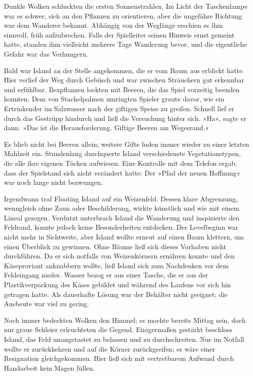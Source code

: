 Dunkle Wolken schluckten die ersten Sonnenstrahlen. Im Licht der Taschenlampe war es schwer, sich an den Pflanzen zu orientieren, aber die ungefähre Richtung war dem Wanderer bekannt. Abhängig von der Weglänge erschien es ihm sinnvoll, früh aufzubrechen. Falls der Spielleiter seinen Hinweis ernst gemeint hatte, standen ihm vielleicht mehrere Tage Wanderung bevor, und die eigentliche Gefahr war das Verhungern.

Bald war Island an der Stelle angekommen, die er vom Baum aus erblickt hatte. Hier verlief der Weg durch Gebüsch und war zwischen Sträuchern gut erkennbar und erfühlbar. Ilexpflanzen lockten mit Beeren, die das Spiel vorzeitig beenden konnten. Dem von Stachelpalmen umringten Spieler graute davor, wie ein Ertrinkender im Salzwasser nach der giftigen Speise zu greifen. Schnell lief er durch das Gestrüpp hindurch und ließ die Versuchung hinter sich. »Ha«, sagte er dann. »Das ist die Herausforderung. Giftige Beeren am Wegesrand.«

Es blieb nicht bei Beeren allein; weitere Gifte luden immer wieder zu einer letzten Mahlzeit ein. Stundenlang durchquerte Island verschiedenste Vegetationstypen, die alle ihre eigenen Tücken aufwiesen. Eine Kontrolle mit dem Telefon ergab, dass der Spielstand sich nicht verändert hatte: Der »Pfad der neuen Hoffnung« war noch lange nicht bezwungen.

Irgendwann traf Floating Island auf ein Weizenfeld. Dessen klare Abgrenzung, wenngleich ohne Zaun oder Beschilderung, wirkte künstlich und wie mit einem Lineal gezogen. Verdutzt unterbrach Island die Wanderung und inspizierte den Feldrand, konnte jedoch keine Besonderheiten entdecken. Der Levelbeginn war nicht mehr in Sichtweite, aber Island wollte erneut auf einen Baum klettern, um einen Überblick zu gewinnen. Ohne Bäume ließ sich dieses Vorhaben nicht durchführen. Da er sich notfalls von Weizenkörnern ernähren konnte und den Käseproviant anknabbern wollte, ließ Island sich zum Nachdenken vor dem Feldeingang nieder. Wasser bezog er aus einer Tasche, die er aus der Plastikverpackung des Käses gebildet und während des Laufens vor sich hin getragen hatte. Als dauerhafte Lösung war der Behälter nicht geeignet; die Ausbeute war viel zu gering.

Noch immer bedeckten Wolken den Himmel; es mochte bereits Mittag sein, doch nur graue Schleier erleuchteten die Gegend. Einigermaßen gestärkt beschloss Island, das Feld unangetastet zu belassen und zu durchschreiten. Nur im Notfall wollte er zurückkehren und auf die Körner zurückgreifen; es wäre einer Resignation gleichgekommen. Hier ließ sich mit vertretbarem Aufwand durch Handarbeit kein Magen füllen.

